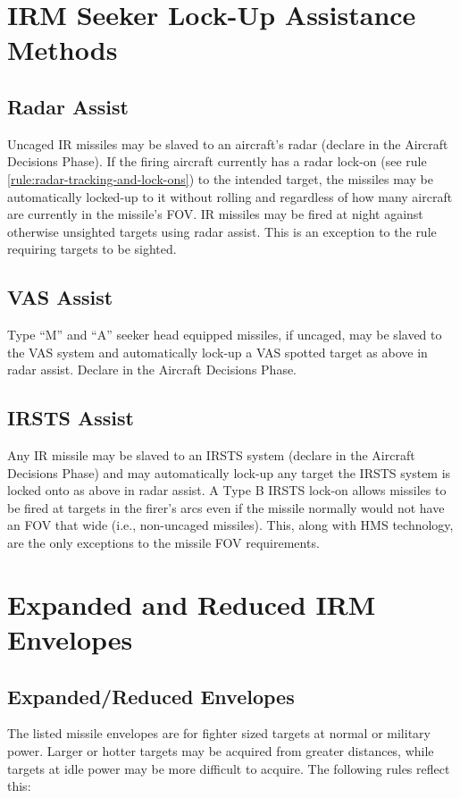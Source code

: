\begin{advancedrules}
    \section{IRM Seeker Lock-Up Assistance Methods}
    \label{rule:irm-seeker-lock-up-assistance-methods}
    \label{rule:irm-radar}
    \label{rule:irm-vas}
    \label{rule:irm-irsts}

    \subsection{Radar Assist} Uncaged IR missiles may be slaved to an aircraft's radar (declare in the Aircraft Decisions Phase). If the firing aircraft currently has a radar lock-on (see rule \ref{rule:radar-tracking-and-lock-ons}) to the intended target, the missiles may be automatically locked-up to it without rolling and regardless of how many aircraft are currently in the missile's FOV. IR missiles may be fired at night against otherwise unsighted targets using radar assist. This is an exception to the rule requiring targets to be sighted.

    \subsection{VAS Assist} Type “M” and “A” seeker head equipped missiles, if uncaged, may be slaved to the VAS system and automatically lock-up a VAS spotted target as above in radar assist. Declare in the Aircraft Decisions Phase.

    \subsection{IRSTS Assist} Any IR missile may be slaved to an IRSTS system (declare in the Aircraft Decisions Phase) and may automatically lock-up any target the IRSTS system is locked onto as above in radar assist. A Type B IRSTS lock-on allows missiles to be fired at targets in the firer's  arcs even if the missile normally would not have an FOV that wide (i.e., non-uncaged missiles). This, along with HMS technology, are the only exceptions to the missile FOV requirements.

    \section{Expanded and Reduced IRM Envelopes}

    \subsection{Expanded/Reduced Envelopes} The listed missile envelopes are for fighter sized targets at normal or military power. Larger or hotter targets may be acquired from greater distances, while targets at idle power may be more difficult to acquire. The following rules reflect this:


\end{advancedrules}
